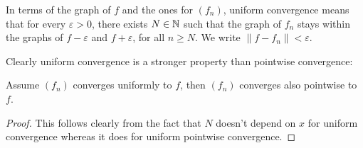\documentclass[10pt, a4paper]{article}
\begin{document}
In terms of the graph of $f$ and the ones for $(f_n)$,
uniform convergence means that for every $\varepsilon > 0$,
there exists $N \in \mathbb{N}$ such that the graph of $f_n$ stays within the graphs of $f - \varepsilon$ and $f + \varepsilon$,
for all $n \geq N$.
We write $\|f - f_n\| < \varepsilon$.

Clearly uniform convergence is a stronger property than pointwise convergence:

\begin{proposition}
    Assume $(f_n)$ converges uniformly to $f$,
    then $(f_n)$ converges also pointwise to $f$.
    \begin{proof}
        This follows clearly from the fact that $N$ doesn't depend on $x$ for uniform convergence whereas it does for uniform pointwise convergence. 
    \end{proof}
\end{proposition}
\end{document}
